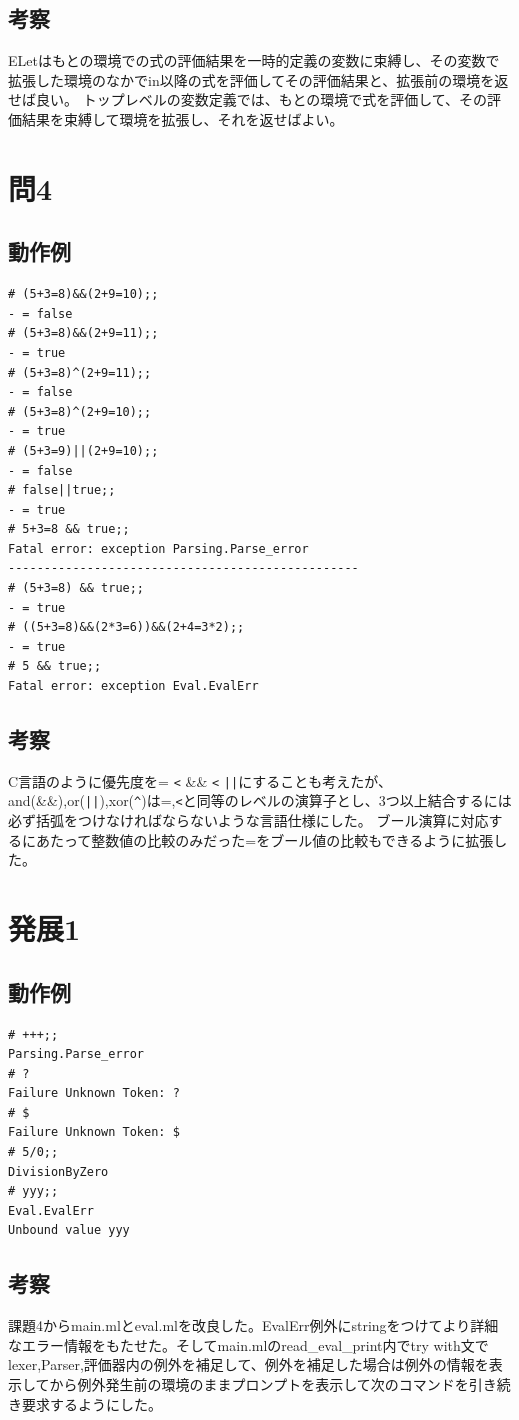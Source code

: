 \documentclass[11pt,a4paper]{jsarticle}
\begin{document}
\subsection*{考察}
ELetはもとの環境での式の評価結果を一時的定義の変数に束縛し、その変数で拡張した環境のなかでin以降の式を評価してその評価結果と、拡張前の環境を返せば良い。
トップレベルの変数定義では、もとの環境で式を評価して、その評価結果を束縛して環境を拡張し、それを返せばよい。
\section*{問4}
\subsection*{動作例}
\begin{lstlisting}[basicstyle=\ttfamily\footnotesize, frame=single]
# (5+3=8)&&(2+9=10);;
- = false
# (5+3=8)&&(2+9=11);;
- = true
# (5+3=8)^(2+9=11);;
- = false
# (5+3=8)^(2+9=10);;
- = true
# (5+3=9)||(2+9=10);;
- = false
# false||true;;
- = true
# 5+3=8 && true;;
Fatal error: exception Parsing.Parse_error
-------------------------------------------------
# (5+3=8) && true;;
- = true
# ((5+3=8)&&(2*3=6))&&(2+4=3*2);;
- = true
# 5 && true;;
Fatal error: exception Eval.EvalErr
\end{lstlisting}
\subsection*{考察}
C言語のように優先度を= \verb|<| \&\& \verb|<| \verb+||+にすることも考えたが、 and(\&\&),or(\verb+||+),xor(\verb|^|)は=,\verb|<|と同等のレベルの演算子とし、3つ以上結合するには必ず括弧をつけなければならないような言語仕様にした。
ブール演算に対応するにあたって整数値の比較のみだった=をブール値の比較もできるように拡張した。
\section*{発展1}
\subsection*{動作例}
\begin{lstlisting}[basicstyle=\ttfamily\footnotesize, frame=single]
# +++;;
Parsing.Parse_error
# ?     
Failure Unknown Token: ?
# $
Failure Unknown Token: $
# 5/0;;
DivisionByZero
# yyy;;
Eval.EvalErr
Unbound value yyy
\end{lstlisting}
\subsection*{考察}
課題4からmain.mlとeval.mlを改良した。EvalErr例外にstringをつけてより詳細なエラー情報をもたせた。そしてmain.mlのread\_eval\_print内でtry with文でlexer,Parser,評価器内の例外を補足して、例外を補足した場合は例外の情報を表示してから例外発生前の環境のままプロンプトを表示して次のコマンドを引き続き要求するようにした。
\end{document}
